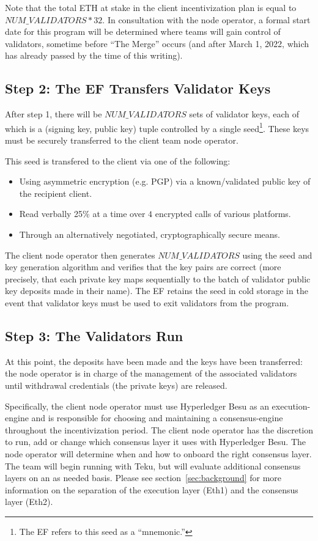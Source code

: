 Note that the total ETH at stake in the client incentivization plan is equal to $NUM\_VALIDATORS * 32$. In consultation with the node operator, a formal start date for this program will be determined where teams will gain control of validators, sometime before ``The Merge'' occurs (and after March 1, 2022, which has already passed by the time of this writing).

\subsection{Step 2:  The EF Transfers Validator Keys}
After step 1, there will be $NUM\_VALIDATORS$ sets of validator keys, each of which is a (signing key, public key) tuple controlled by a single seed\footnote{The EF refers to this seed as a ``mnemonic.''}. These keys must be securely transferred to the client team node operator.

This seed is transfered to the client via one of the following:
\begin{itemize}
\item Using asymmetric encryption (e.g. PGP) via a known/validated public key of the recipient client.
\item Read verbally 25\% at a time over $4$ encrypted calls of various platforms.
\item Through an alternatively negotiated, cryptographically secure means.
\end{itemize}

The client node operator then generates $NUM\_VALIDATORS$ using the seed and key generation algorithm and verifies that the key pairs are correct (more precisely, that each private key maps sequentially to the batch of validator public key deposits made in their name). The EF retains the seed in cold storage in the event that validator keys must be used to exit validators from the program.


\subsection{Step 3:  The Validators Run}
At this point, the deposits have been made and the keys have been transferred:  the node operator is in charge of the management of the associated validators until withdrawal credentials (the private keys) are released. 

Specifically, the client node operator must use Hyperledger Besu as an execution-engine and is responsible for choosing and maintaining a consensus-engine throughout the incentivization period.  The client node operator has the discretion to run, add or change which consensus layer it uses with Hyperledger Besu. The node operator will determine when and how to onboard the right consensus layer. The team will begin running with Teku, but will evaluate additional consensus layers on an as needed basis.  Please see section~\ref{sec:background} for more information on the separation of the execution layer (Eth1) and the consensus layer (Eth2).

